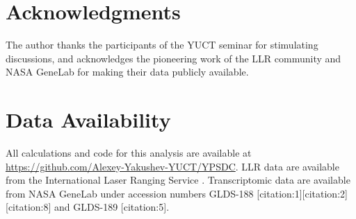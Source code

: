 \documentclass[12pt,a4paper]{article}
\theoremstyle{remark}
\begin{document}
	\section*{Acknowledgments}
	
	The author thanks the participants of the YUCT seminar for stimulating discussions, and acknowledges the pioneering work of the LLR community and NASA GeneLab for making their data publicly available.
	
	\section*{Data Availability}
	
	All calculations and code for this analysis are available at \url{https://github.com/Alexey-Yakushev-YUCT/YPSDC}. LLR data are available from the International Laser Ranging Service \cite{ILRS}. Transcriptomic data are available from NASA GeneLab \cite{NASA-GeneLab} under accession numbers GLDS-188 [citation:1][citation:2][citation:8] and GLDS-189 [citation:5].
	
\end{document}
